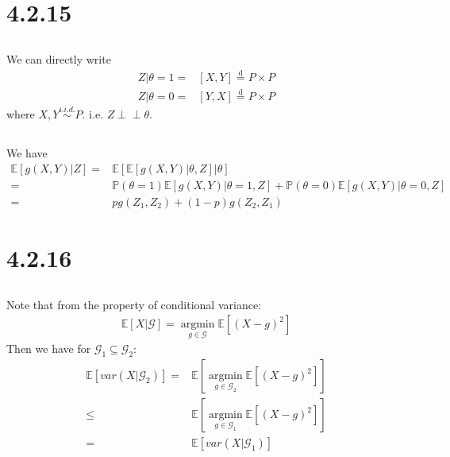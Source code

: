 \documentclass[11pt,a4paper]{ctexart}
\numberwithin{equation}{section}%
\begin{document}
\section{4.2.15}

\subsection{}
We can directly write
\begin{align*}
    Z|\theta =1 =& [X,Y] \mathop{ = }\limits^{\mathrm{ d } } P\times P\\
    Z|\theta =0 =& [Y,X] \mathop{ = }\limits^{\mathrm{ d } } P\times P  
\end{align*}
where $ X,Y \mathop{ \sim }\limits^{i.i.d.}  P $. i.e. $ Z \perp \!\!\!\perp \theta $.


\subsection{}

We have
\begin{align*}
    \mathbb{E}\left[ g(X,Y)  |Z\right]  =& \mathbb{E}\left[ \mathbb{E}\left[ g(X,Y) |\theta ,Z\right] |\theta  \right]  \\
    =& \mathbb{P}\left( \theta =1  \right) \mathbb{E}\left[ g(X,Y)|\theta =1,Z \right] + \mathbb{P}\left( \theta =0  \right) \mathbb{E}\left[ g(X,Y)|\theta =0,Z \right]\\
    =& pg(Z_1,Z_2) + (1-p)g(Z_2,Z_1)
\end{align*}


\section{4.2.16}

\subsection{}
Note that from the property of conditional variance:
\begin{align*}
    \mathbb{E}\left[ X|\mathcal{G} \right] = \mathop{ \arg\min }\limits_{g\in \mathcal{G} } \mathbb{E}\left[ (X-g)^2 \right]   
\end{align*}
Then we have for $ \mathcal{G}_1\subseteq \mathcal{G}_2 $:
\begin{align*}
    \mathbb{E}\left[ var(X|\mathcal{G}_2) \right] =& \mathbb{E}\left[ \mathop{ \arg\min }\limits_{g\in \mathcal{G}_2 } \mathbb{E}\left[ (X-g)^2 \right]   \right]   \\
    \leq&  \mathbb{E}\left[ \mathop{ \arg\min }\limits_{g\in \mathcal{G}_1 } \mathbb{E}\left[ (X-g)^2 \right]   \right] \\
    =& \mathbb{E}\left[ var(X|\mathcal{G}_1) \right]
\end{align*}
\end{document}

